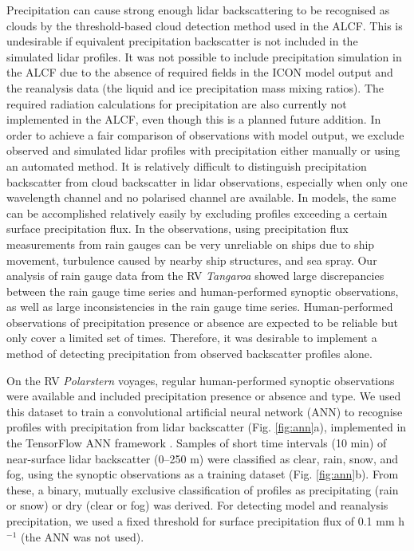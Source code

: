 \documentclass[12pt,a4paper]{article}
\begin{document}
Precipitation can cause strong enough lidar backscattering to be recognised as
clouds by the threshold-based cloud detection method used in the ALCF. This is
undesirable if equivalent precipitation backscatter is not included in the
simulated lidar profiles. It was not possible to include precipitation
simulation in the ALCF due to the absence of required fields in the ICON model
output and the reanalysis data (the liquid and ice precipitation mass mixing
ratios). The required radiation calculations for precipitation are also
currently not implemented in the ALCF, even though this is a planned future addition.
In order to achieve a fair comparison of observations with model output, we
exclude observed and simulated lidar profiles with precipitation either
manually or using an automated method. It is relatively difficult to
distinguish precipitation backscatter from cloud backscatter in lidar
observations, especially when only one wavelength channel and no polarised
channel are available. In models, the same can be accomplished relatively
easily by excluding profiles exceeding a certain surface
precipitation flux. In the observations, using precipitation flux measurements
from rain gauges can be very unreliable on ships due to ship movement,
turbulence caused by nearby ship structures, and sea spray. Our analysis of
rain gauge data from the RV \emph{Tangaroa} showed large discrepancies between
the rain gauge time series and human-performed synoptic observations, as well
as large inconsistencies in the rain gauge time series. Human-performed
observations of precipitation presence or absence are expected to be reliable
but only cover a limited set of times. Therefore, it was desirable to
implement a method of detecting precipitation from observed backscatter
profiles alone.

On the RV \emph{Polarstern} voyages, regular human-performed synoptic
observations were available and included precipitation presence or absence and
type. We used this dataset to train a convolutional artificial neural network
(ANN) to recognise profiles with precipitation from lidar backscatter (Fig.
\ref{fig:ann}a), implemented in the TensorFlow ANN framework
\citep{tensorflow}. Samples of short time intervals (10 min) of near-surface
lidar backscatter (0–250 m) were classified as clear, rain, snow, and fog,
using the synoptic observations as a training dataset (Fig.  \ref{fig:ann}b).
From these, a binary, mutually exclusive classification of profiles as
precipitating (rain or snow) or dry (clear or fog) was derived.  For detecting
model and reanalysis precipitation, we used a fixed threshold for surface
precipitation flux of 0.1 mm h$^{-1}$ (the ANN was not used).
\end{document}
